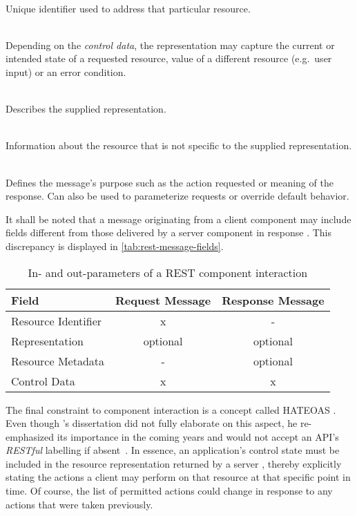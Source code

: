 \begin{appendices}
\begin{description}[format={\storedescriptionlabel}]
	\item[Resource identifier]
	\hfill \\
	Unique identifier used to address that particular resource.
	\item[Representation]
	\hfill \\
	Depending on the \textit{control data}, the representation may capture the current or intended state of a requested resource, value of a different resource (e.g.~user input) or an error condition.
	\item[Representation metadata]
	\hfill \\
	Describes the supplied representation.
	\item[Resource metadata]
	\hfill \\
	Information about the resource that is not specific to the supplied representation.
	\item[Control data]
	\hfill \\
	Defines the message's purpose such as the action requested or meaning of the response. Can also be used to parameterize requests or override default behavior.
\end{description}

It shall be noted that a message originating from a client component may include fields different from those delivered by a server component in response \cite[pp.~93--94]{fielding2000architectural}. This discrepancy is displayed in \autoref{tab:rest-message-fields}.

\begin{table}[hbt]
	\centering
  	\begin{tabular}{|l|c|c|}
  		\hline
	    \textbf{Field} & \textbf{Request Message} & \textbf{Response Message} \\
	    \hline
	    Resource Identifier 	& x & - \\
	    Representation 			& optional & optional \\
	    Resource Metadata 		& - & optional \\
	    Control Data 			& x & x \\
	    	\hline
	\end{tabular}
  	\caption{In- and out-parameters of a \acs*{REST} component interaction}
  	\label{tab:rest-message-fields}
\end{table}

The final constraint to component interaction is a concept called \acl*{HATEOAS} \cite[p.~82]{fielding2000architectural}. Even though \citeauthor{fielding2000architectural}'s dissertation did not fully elaborate on this aspect, he re-emphasized its importance in the coming years and would not accept an \acs{API}'s \textit{\ac{REST}ful} labelling if absent~\cite{fielding2008hypertext}. In essence, an application's control state must be included in the resource representation returned by a server \cite[p.~102]{fielding2000architectural}, thereby explicitly stating the actions a client may perform on that resource at that specific point in time. Of course, the list of permitted actions could change in response to any actions that were taken previously.



\end{appendices}
